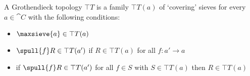 \begin{definition}

A Grothendieck topology $\top{T}$ is a family $\top{T}(a)$ 
of `covering' sieves for every $a\in \cat{C}$ with the following conditions:

\begin{itemize}
\item  $\maxsieve{a} \in \top{T}(a)$
\item $\spull{f}R\in \top{T}(a')$ if $R\in \top{T}(a)$ 
		for all $f:a'\rightarrow a$
\item if $\spull{f}R\in \top{T}(a')$ for all $f\in S$ 
		with $S\in \top{T}(a)$ then $R\in \top{T}(a)$
\end{itemize}

\end{definition}


